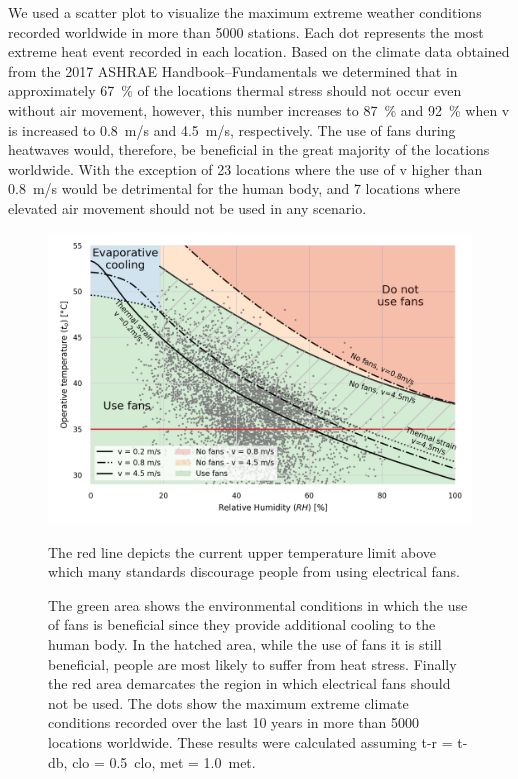 We used a scatter plot to visualize the maximum extreme weather conditions recorded worldwide in more than 5000 stations.
Each dot represents the most extreme heat event recorded in each location.
Based on the climate data obtained from the 2017 ASHRAE Handbook--Fundamentals we determined that in approximately 67~\% of the locations thermal stress should not occur even without air movement, however, this number increases to 87~\% and 92~\% when \ac{v} is increased to 0.8~m/s and 4.5~m/s, respectively.
The use of fans during heatwaves would, therefore, be beneficial in the great majority of the locations worldwide.
With the exception of 23 locations where the use of \ac{v} higher than 0.8~m/s would be detrimental for the human body, and 7 locations where elevated air movement should not be used in any scenario.



\begin{figure}[thb!]
    \centering
    \includegraphics[width=\textwidth]{figures/use_fans}
    \caption{The green area shows the environmental conditions in which the use of fans is beneficial since they provide additional cooling to the human body.
    In the hatched area, while the use of fans it is still beneficial, people are most likely to suffer from heat stress.
    Finally the red area demarcates the region in which electrical fans should not be used.
    The dots show the maximum extreme climate conditions recorded over the last 10 years in more than 5000 locations worldwide.
     These results were calculated assuming \ac{t-r} = \ac{t-db}, \ac{clo} = 0.5~clo, \ac{met} = 1.0~met.}
    The red line depicts the current upper temperature limit above which many standards discourage people from using electrical fans.
    \label{fig:energy_storage_delta}
\end{figure}


